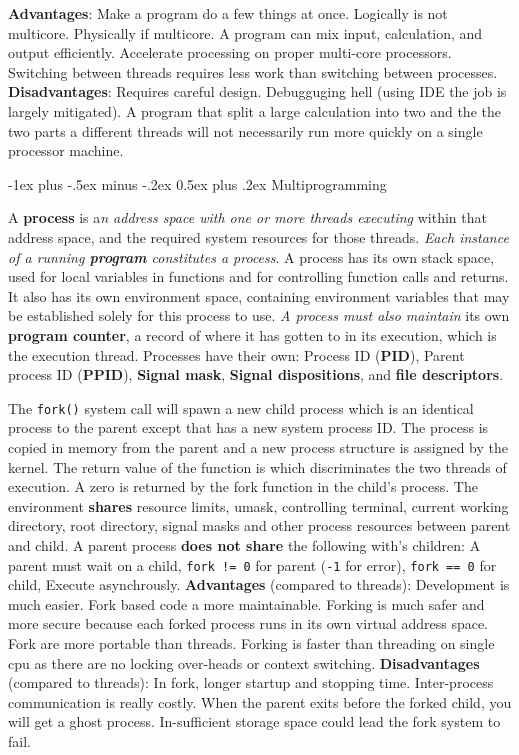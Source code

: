 \documentclass[10pt,landscape, a4paper]{article}
\makeatletter
\renewcommand{\subsection}{\@startsection{section}{1}{0mm}%
                                {-1ex plus -.5ex minus -.2ex}%
                                {0.5ex plus .2ex}%
                                {\normalfont\large\bfseries}}
\makeatother
\begin{document}
\begin{multicols}{3}
\textbf{Advantages}:
Make a program do a few things at once.
Logically is not multicore.
Physically if multicore.
A program can mix input, calculation, and output efficiently.
Accelerate processing on proper multi-core processors.
Switching between threads requires less work than switching between processes.
\textbf{Disadvantages}:
Requires careful design.
Debugguging hell (using IDE the job is largely mitigated).
A program that split a large calculation into two and the 
the two parts a different threads will not necessarily 
run more quickly on a single processor machine.

\subsection{Multiprogramming}

A \textbf{process} is a\emph{n address space
with one or more threads executing} within that address space, 
and the required system resources for those threads. \emph{Each instance of a running 
\textbf{program} constitutes a process}. A process has its own stack space, used for local 
variables in functions and for controlling function calls and returns. 
It also has its own environment space, containing environment variables 
that may be established solely for this process to use. \emph{A process must 
also maintain} its own \textbf{program counter}, a record of where it has gotten 
to in its execution, which is the execution thread. Processes have their
own: Process ID (\textbf{PID}), Parent process ID (\textbf{PPID}), \textbf{Signal mask},\textbf{ Signal dispositions}, 
and \textbf{file descriptors}.


The \texttt{fork()} system call will spawn a new child process which is an 
identical process to the parent except that has a new system process ID. 
The process is copied in memory from the parent and a new process structure 
is assigned by the kernel. The return value of the function is which 
discriminates the two threads of execution. A zero is returned by the 
fork function in the child's process.
The environment \textbf{shares} resource limits, umask, controlling terminal, 
current working directory, root directory, signal masks and other 
process resources between parent and child.
A parent process \textbf{does not share} the following with's children:
A parent must wait on a child,
\texttt{fork != 0} for parent (\texttt{-1} for error),
\texttt{fork == 0} for child,
Execute asynchrously.
\textbf{Advantages} (compared to threads):
Development is much easier.
Fork based code a more maintainable.
Forking is much safer and more secure because each forked process runs in its own virtual address space.
Fork are more portable than threads.
Forking is faster than threading on single cpu as there are no locking over-heads or context switching.
\textbf{Disadvantages} (compared to threads):
In fork, longer startup and stopping time.
Inter-process communication is really costly.
When the parent exits before the forked child, you will get a ghost process.
In-sufficient storage space could lead the fork system to fail.


\end{multicols}
\end{document}
